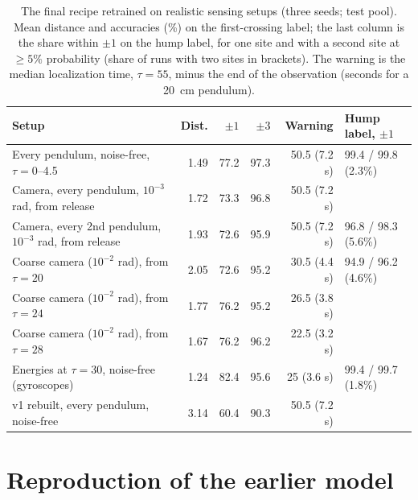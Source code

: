 \documentclass[11pt]{article}
\newif\ifdraftnotes
\newcommand{\authorreview}[1]{%
  \ifdraftnotes
    \par\medskip\noindent
    \fcolorbox{red!70!black}{red!4}{\parbox{\dimexpr\linewidth-2\fboxsep-2\fboxrule\relax}{%
      \small\textbf{TODO-AUTHOR-REVIEW.} #1}}%
    \par\medskip
  \fi}
\begin{document}
\begin{table}[htbp]
  \centering
  \caption{The final recipe retrained on realistic sensing setups (three seeds; test pool). Mean distance and accuracies (\%) on the first-crossing label; the last column is the share within $\pm1$ on the hump label, for one site and with a second site at $\ge5\%$ probability (share of runs with two sites in brackets). The warning is the median localization time, $\tau=55$, minus the end of the observation (seconds for a 20~cm pendulum).}
  \label{tab:setups}
  \small
  \setlength{\tabcolsep}{4pt}
  \begin{tabular}{@{}lrrrrl@{}}
    \toprule
    Setup & Dist. & $\pm1$ & $\pm3$ & Warning & Hump label, $\pm1$ \\
    \midrule
    Every pendulum, noise-free, $\tau=0$--4.5 & 1.49 & 77.2 & 97.3 & 50.5 (7.2 s) & 99.4 / 99.8 (2.3\%) \\
    Camera, every pendulum, $10^{-3}$ rad, from release & 1.72 & 73.3 & 96.8 & 50.5 (7.2 s) & \\
    Camera, every 2nd pendulum, $10^{-3}$ rad, from release & 1.93 & 72.6 & 95.9 & 50.5 (7.2 s) & 96.8 / 98.3 (5.6\%) \\
    Coarse camera ($10^{-2}$ rad), from $\tau=20$ & 2.05 & 72.6 & 95.2 & 30.5 (4.4 s) & 94.9 / 96.2 (4.6\%) \\
    Coarse camera ($10^{-2}$ rad), from $\tau=24$ & 1.77 & 76.2 & 95.2 & 26.5 (3.8 s) & \\
    Coarse camera ($10^{-2}$ rad), from $\tau=28$ & 1.67 & 76.2 & 96.2 & 22.5 (3.2 s) & \\
    Energies at $\tau=30$, noise-free (gyroscopes) & 1.24 & 82.4 & 95.6 & 25 (3.6 s) & 99.4 / 99.7 (1.8\%) \\
    \midrule
    v1 rebuilt, every pendulum, noise-free & 3.14 & 60.4 & 90.3 & 50.5 (7.2 s) & \\
    \bottomrule
  \end{tabular}
\end{table}

\section{Reproduction of the earlier model}
\label{sec:repro}

\authorreview{This section is under discussion with the corresponding author of Ref.~\cite{mittal2026jand}, including how to word the discrepancy and whether the original training code can be recovered. It states only what the rebuild shows; do not post before the wording is agreed.}
\end{document}
